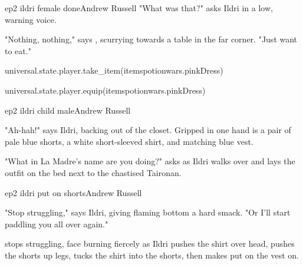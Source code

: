 \documentclass{book}
\begin{document}
\begin{childnode}{ep2 ildri female done}{Andrew Russell}
    "What was that?" asks Ildri in a low, warning voice.

    "Nothing, nothing," says \name{}, scurrying towards a table in the far corner. "Just want to eat."

    \begin{code}

        universal.state.player.take\_item(itemspotionwars.pinkDress)

        universal.state.player.equip(itemspotionwars.pinkDress)

    \end{code}



\end{childnode}

\begin{childnode}{ep2 ildri child male}{Andrew Russell}

    "Ah-hah!" says Ildri, backing out of the closet. Gripped in one hand is a pair of pale blue shorts, a white short-sleeved shirt, and matching blue vest.

    "What in La Madre's name are you doing?" asks \name{} as Ildri walks over and lays the outfit on the bed next to the chastised Taironan.




\end{childnode}

\begin{childnode}{ep2 ildri put on shorts}{Andrew Russell}

    "Stop struggling," says Ildri, giving \names{} flaming bottom a hard smack. "Or I'll start paddling you all over again."

    \name{} stops struggling, \hisher{} face burning fiercely as Ildri pushes the shirt over \hisher{} head, pushes the shorts up \hisher{} legs, tucks the shirt into the shorts, then makes \himher{}
    put on the vest on.


\end{childnode}
\end{document}
